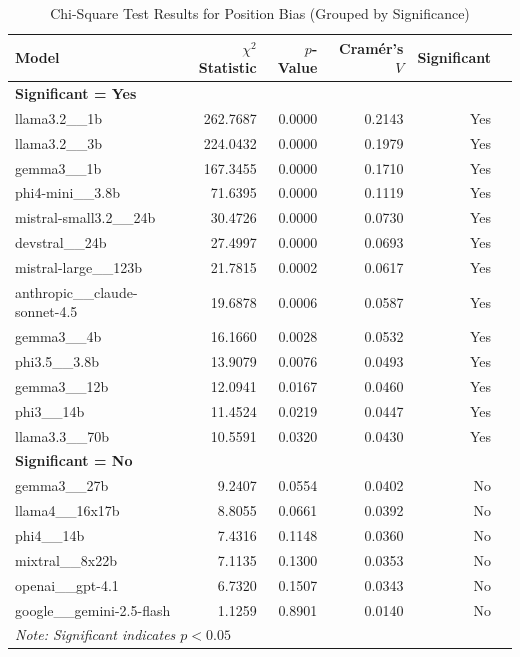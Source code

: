 \begin{table}[htbp]
\centering
\caption{Chi-Square Test Results for Position Bias (Grouped by Significance)}
\label{tab:chi_square_position_mirror}
\begin{tabular}{lrrrrl}
\toprule
Model & $\chi^2$ Statistic & $p$-Value & Cramér's $V$ & Significant \\
\midrule
\multicolumn{5}{l}{\textbf{Significant = Yes}} \\
\midrule
llama3.2\_\_1b                      & 262.7687 & 0.0000 & 0.2143 & Yes \\
llama3.2\_\_3b                      & 224.0432 & 0.0000 & 0.1979 & Yes \\
gemma3\_\_1b                        & 167.3455 & 0.0000 & 0.1710 & Yes \\
phi4-mini\_\_3.8b                   & 71.6395  & 0.0000 & 0.1119 & Yes \\
mistral-small3.2\_\_24b             & 30.4726  & 0.0000 & 0.0730 & Yes \\
devstral\_\_24b                     & 27.4997  & 0.0000 & 0.0693 & Yes \\
mistral-large\_\_123b               & 21.7815  & 0.0002 & 0.0617 & Yes \\
anthropic\_\_claude-sonnet-4.5      & 19.6878  & 0.0006 & 0.0587 & Yes \\
gemma3\_\_4b                        & 16.1660  & 0.0028 & 0.0532 & Yes \\
phi3.5\_\_3.8b                      & 13.9079  & 0.0076 & 0.0493 & Yes \\
gemma3\_\_12b                       & 12.0941  & 0.0167 & 0.0460 & Yes \\
phi3\_\_14b                         & 11.4524  & 0.0219 & 0.0447 & Yes \\
llama3.3\_\_70b                     & 10.5591  & 0.0320 & 0.0430 & Yes \\
\midrule
\multicolumn{5}{l}{\textbf{Significant = No}} \\
\midrule
gemma3\_\_27b                       & 9.2407   & 0.0554 & 0.0402 & No  \\
llama4\_\_16x17b                    & 8.8055   & 0.0661 & 0.0392 & No  \\
phi4\_\_14b                         & 7.4316   & 0.1148 & 0.0360 & No  \\
mixtral\_\_8x22b                    & 7.1135   & 0.1300 & 0.0353 & No  \\
openai\_\_gpt-4.1                   & 6.7320   & 0.1507 & 0.0343 & No  \\
google\_\_gemini-2.5-flash          & 1.1259   & 0.8901 & 0.0140 & No  \\
\midrule
\multicolumn{5}{l}{\footnotesize \textit{Note: Significant indicates $p < 0.05$}} \\
\bottomrule
\end{tabular}
\end{table}

